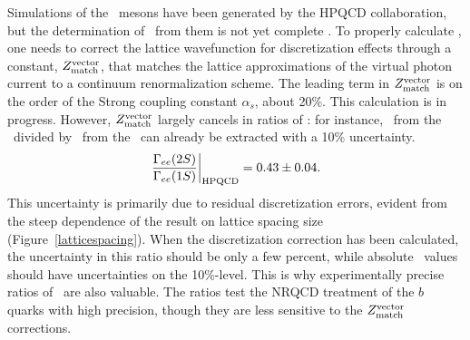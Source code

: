 \documentclass{cornell}
\begin{document}
Simulations of the \ups\ mesons have been generated by the HPQCD
collaboration, but the determination of \gee\ from them is not yet
complete \cite{ukqcd}.  To properly calculate \gee, one needs to
correct the lattice wavefunction for discretization effects through a
constant, $Z_{\mbox{\scriptsize match}}^{\mbox{\scriptsize vector}}$, that matches the lattice
approximations of the virtual photon current to a continuum
renormalization scheme.  The leading term in
$Z_{\mbox{\scriptsize match}}^{\mbox{\scriptsize vector}}$ is on the order of the Strong coupling
constant $\alpha_s$, about 20\%.  This calculation is in progress.
However, $Z_{\mbox{\scriptsize match}}^{\mbox{\scriptsize vector}}$ largely cancels in ratios of
\gee: for instance, \gee\ from the \uss\ divided by \gee\ from the
\us\ can already be extracted with a 10\% uncertainty.
\begin{equation}
  \left. \frac{\Gamma_{ee}(2S)}{\Gamma_{ee}(1S)}
  \right|_{\mbox{\scriptsize HPQCD}} = 0.43 \pm 0.04 \mbox{.}
  \label{eqn:latticeresult}
\end{equation}
This uncertainty is primarily due to residual discretization errors,
evident from the steep dependence of the result on lattice spacing
size (Figure~\ref{latticespacing}).  When the discretization
correction has been calculated, the uncertainty in this ratio should
be only a few percent, while absolute \gee\ values should have
uncertainties on the 10\%-level.  This is why experimentally precise
ratios of \gee\ are also valuable.  The ratios test the NRQCD
treatment of the $b$ quarks with high precision, though they are less
sensitive to the $Z_{\mbox{\scriptsize match}}^{\mbox{\scriptsize vector}}$ corrections.
\end{document}
